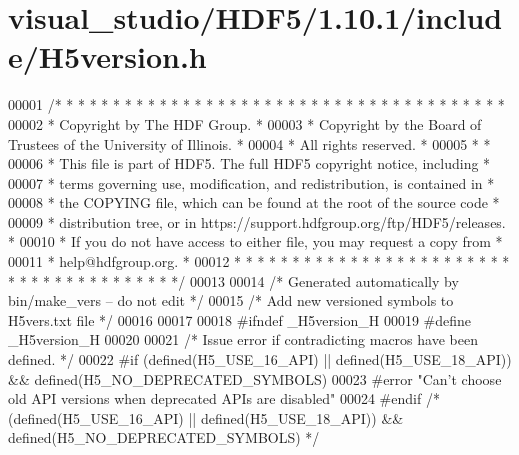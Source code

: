 \hypertarget{visual__studio_2_h_d_f5_21_810_81_2include_2_h5version_8h_source}{}\section{visual\+\_\+studio/\+H\+D\+F5/1.10.1/include/\+H5version.h}
\label{visual__studio_2_h_d_f5_21_810_81_2include_2_h5version_8h_source}

\begin{DoxyCode}
00001 \textcolor{comment}{/* * * * * * * * * * * * * * * * * * * * * * * * * * * * * * * * * * * * * * *}
00002 \textcolor{comment}{ * Copyright by The HDF Group.                                               *}
00003 \textcolor{comment}{ * Copyright by the Board of Trustees of the University of Illinois.         *}
00004 \textcolor{comment}{ * All rights reserved.                                                      *}
00005 \textcolor{comment}{ *                                                                           *}
00006 \textcolor{comment}{ * This file is part of HDF5.  The full HDF5 copyright notice, including     *}
00007 \textcolor{comment}{ * terms governing use, modification, and redistribution, is contained in    *}
00008 \textcolor{comment}{ * the COPYING file, which can be found at the root of the source code       *}
00009 \textcolor{comment}{ * distribution tree, or in https://support.hdfgroup.org/ftp/HDF5/releases.  *}
00010 \textcolor{comment}{ * If you do not have access to either file, you may request a copy from     *}
00011 \textcolor{comment}{ * help@hdfgroup.org.                                                        *}
00012 \textcolor{comment}{ * * * * * * * * * * * * * * * * * * * * * * * * * * * * * * * * * * * * * * */}
00013 
00014 \textcolor{comment}{/* Generated automatically by bin/make\_vers -- do not edit */}
00015 \textcolor{comment}{/* Add new versioned symbols to H5vers.txt file */}
00016 
00017 
00018 \textcolor{preprocessor}{#ifndef \_H5version\_H}
00019 \textcolor{preprocessor}{#define \_H5version\_H}
00020 
00021 \textcolor{comment}{/* Issue error if contradicting macros have been defined. */}
00022 \textcolor{preprocessor}{#if (defined(H5\_USE\_16\_API) || defined(H5\_USE\_18\_API)) && defined(H5\_NO\_DEPRECATED\_SYMBOLS)}
00023 \textcolor{preprocessor}{  #error "Can't choose old API versions when deprecated APIs are disabled"}
00024 \textcolor{preprocessor}{#endif }\textcolor{comment}{/* (defined(H5\_USE\_16\_API) || defined(H5\_USE\_18\_API)) && defined(H5\_NO\_DEPRECATED\_SYMBOLS) */}\textcolor{preprocessor}{}

\end{DoxyCode}
